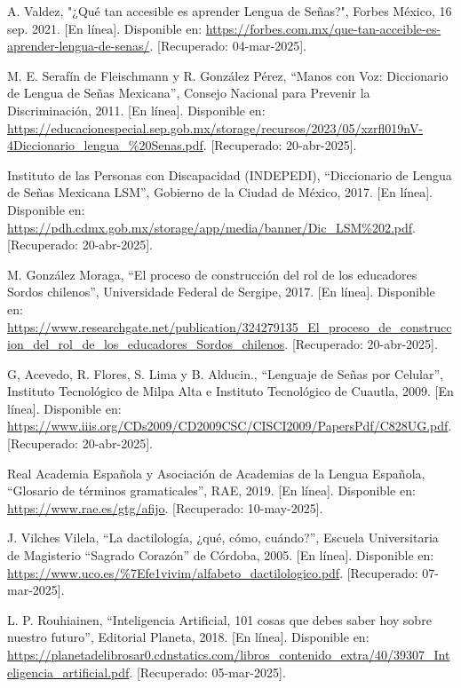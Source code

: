 \begin{thebibliography}{200}
    A. Valdez, "¿Qué tan accesible es aprender Lengua de Señas?", Forbes México, 16 sep. 2021. [En línea]. Disponible en: \url{https://forbes.com.mx/que-tan-acceible-es-aprender-lengua-de-senas/}. [Recuperado: 04-mar-2025].

    M. E. Serafín de Fleischmann y R. González Pérez, “Manos con Voz: Diccionario de Lengua de Señas Mexicana”, Consejo Nacional para Prevenir la Discriminación, 2011. [En línea]. Disponible en: \url{https://educacionespecial.sep.gob.mx/storage/recursos/2023/05/xzrfl019nV-4Diccionario_lengua_%20Senas.pdf}. [Recuperado: 20-abr-2025].

    Instituto de las Personas con Discapacidad (INDEPEDI), “Diccionario de Lengua de Señas Mexicana LSM”, Gobierno de la Ciudad de México, 2017. [En línea]. Disponible en: \url{https://pdh.cdmx.gob.mx/storage/app/media/banner/Dic_LSM%202.pdf}. [Recuperado: 20-abr-2025].

    M. González Moraga, “El proceso de construcción del rol de los educadores Sordos chilenos”, Universidade Federal de Sergipe, 2017. [En línea]. Disponible en: \url{https://www.researchgate.net/publication/324279135_El_proceso_de_construccion_del_rol_de_los_educadores_Sordos_chilenos}. [Recuperado: 20-abr-2025].

    G, Acevedo, R. Flores, S. Lima y B. Alducin., “Lenguaje de Señas por Celular”, Instituto Tecnológico de Milpa Alta e Instituto Tecnológico de Cuautla, 2009. [En línea]. Disponible en: \url{https://www.iiis.org/CDs2009/CD2009CSC/CISCI2009/PapersPdf/C828UG.pdf}. [Recuperado: 20-abr-2025].

    Real Academia Española y Asociación de Academias de la Lengua Española, “Glosario de términos gramaticales”, RAE, 2019. [En línea]. Disponible en: \url{https://www.rae.es/gtg/afijo}. [Recuperado: 10-may-2025].

    J. Vilches Vilela, “La dactilología, ¿qué, cómo, cuándo?”, Escuela Universitaria de Magisterio “Sagrado Corazón” de Córdoba, 2005. [En línea]. Disponible en: \url{https://www.uco.es/%7Efe1vivim/alfabeto_dactilologico.pdf}. [Recuperado: 07-mar-2025].

    L. P. Rouhiainen, “Inteligencia Artificial, 101 cosas que debes saber hoy sobre nuestro futuro”, Editorial Planeta, 2018. [En línea]. Disponible en: \url{https://planetadelibrosar0.cdnstatics.com/libros_contenido_extra/40/39307_Inteligencia_artificial.pdf}. [Recuperado: 05-mar-2025].


\end{thebibliography}
